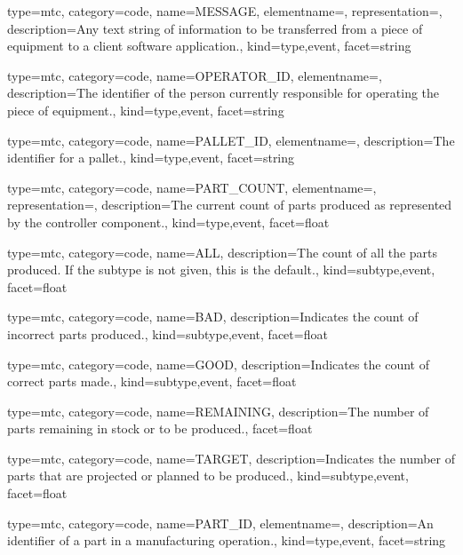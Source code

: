 {
  type=mtc,
  category=code,
  name={MESSAGE},
  elementname=,
  representation=,
  description={Any text string of information to be transferred from a piece of equipment to a client software application.},
  kind={type,event},
  facet={\gls{string}}
}


{
  type=mtc,
  category=code,
  name={OPERATOR\_ID},
  elementname=,
  description={The identifier of the person currently responsible for operating the piece of equipment.},
  kind={type,event},
  facet={\gls{string}}
}


{
  type=mtc,
  category=code,
  name={PALLET\_ID},
  elementname=,
  description={The identifier for a pallet.},
  kind={type,event},
  facet={\gls{string}}
}


{
  type=mtc,
  category=code,
  name={PART\_COUNT},
  elementname=,
  representation=,
  description={The current count of parts produced as represented by the \gls{controller} component.},
  kind={type,event},
  facet={\gls{float}}
}


{
  type=mtc,
  category=code,
  name={ALL},
  description={The count of all the parts produced.  If the subtype is not given, this is the default.},
  kind={subtype,event},
  facet={\gls{float}}
}


{
  type=mtc,
  category=code,
  name={BAD},
  description={Indicates the count of incorrect parts produced.},
  kind={subtype,event},
  facet={\gls{float}}
}


{
  type=mtc,
  category=code,
  name={GOOD},
  description={Indicates the count of correct parts made.},
  kind={subtype,event},
  facet={\gls{float}}
}


{
  type=mtc,
  category=code,
  name={REMAINING},
  description={The number of parts remaining in stock or to be produced.},
  facet={\gls{float}}
}


{
  type=mtc,
  category=code,
  name={TARGET},
  description={Indicates the number of parts that are projected or planned to be produced.},
  kind={subtype,event},
  facet={\gls{float}}
}


{
  type=mtc,
  category=code,
  name={PART\_ID},
  elementname=,
  description={An identifier of a part in a manufacturing operation.},
  kind={type,event},
  facet={\gls{string}}
}


